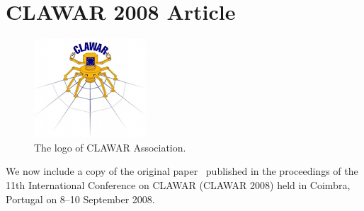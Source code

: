 
\chapter{CLAWAR 2008 Article}

\begin{figure}[h]
\centering
\includegraphics{figures/clawar_logo}
\caption[CLAWAR logo]{The logo of \ac{CLAWAR} Association.}
\label{img:clawar_logo}
\end{figure}

We now include a copy of the original paper~\cite{saponaro:2008} published in the proceedings of the 11th International Conference on \acl{CLAWAR} (\acs{CLAWAR} 2008) held in Coimbra, Portugal on 8--10 September 2008.

